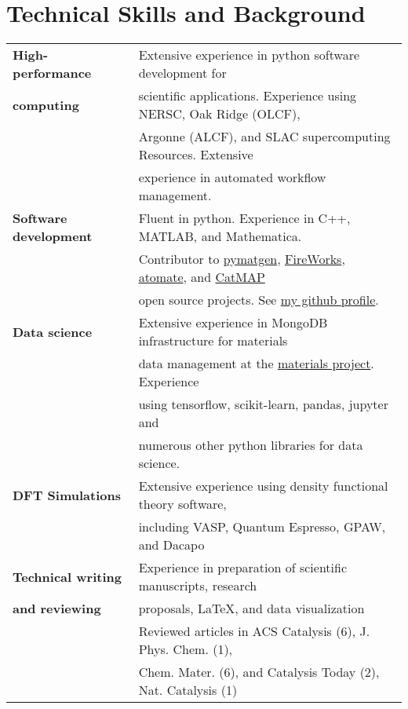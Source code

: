 \documentclass[a4paper,10pt]{article}
\begin{document}
\section{Technical Skills and Background}
\begin{tabular}{ll}
 \textbf{High-performance} & Extensive experience in python software development for \\ 
 \textbf{computing}  & scientific applications.  Experience using NERSC, Oak Ridge (OLCF), \\
 & Argonne (ALCF), and SLAC supercomputing Resources.  Extensive  \\
 &experience in automated workflow management.\vspace{0.13in} \\

 \textbf{Software development} & Fluent in python.  Experience in C++, MATLAB, and Mathematica. \vspace{0.05in} \\
 & Contributor to \href{pymatgen.org}{pymatgen}, \href{https://materialsproject.github.io/fireworks/}{FireWorks}, \href{https://hackingmaterials.github.io/atomate}{atomate}, and \href{http://catmap.readthedocs.io/en/latest/}{CatMAP}\\
 & open source projects. See \href{https://github.com/montoyjh}{my github profile}.  \vspace{0.13in}\\


 \textbf{Data science} & Extensive experience in MongoDB infrastructure for materials \\
 & data management at the \href{http://materialsproject.org}{materials project}.  Experience \\
 & using tensorflow, scikit-learn, pandas, jupyter and \\
 & numerous other python libraries for data science.\vspace{0.13in}\\
 \textbf{DFT Simulations} & Extensive experience using density functional theory software, \\
 & including VASP, Quantum Espresso, GPAW, and Dacapo \vspace{0.13in}\\
 \textbf{Technical writing} & Experience in preparation of scientific manuscripts, research \\
 \textbf{and reviewing} & proposals, \LaTeX, and data visualization \vspace{0.05in}\\
& Reviewed articles in ACS Catalysis (6), J. Phys. Chem. (1), \\
& Chem. Mater. (6), and Catalysis Today (2), Nat. Catalysis (1)
 \end{tabular}
\end{document}
